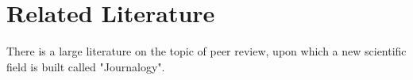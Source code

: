 \documentclass[12pt]{article}
\begin{document}


\section{Related Literature}
There is a large literature on the topic of peer review, upon which a new
scientific field is built called "Journalogy".
\end{document}
